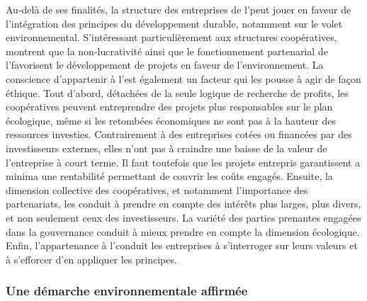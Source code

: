             Au-delà de ses finalités, la structure des entreprises de l’\ess peut jouer en faveur de l’intégration des principes du développement durable, notamment sur le volet environnemental. S’intéressant particulièrement aux structures coopératives, \textcite{bocquet2010economie} montrent que la non-lucrativité ainsi que le fonctionnement partenarial de l’\ess favorisent le développement de projets en faveur de l’environnement. La conscience d’appartenir à l’\ess est également un facteur qui les pousse à agir de façon éthique. Tout d’abord, détachées de la seule logique de recherche de profits, les coopératives peuvent entreprendre des projets plus responsables sur le plan écologique, même si les retombées économiques ne sont pas à la hauteur des ressources investies. Contrairement à des entreprises cotées ou financées par des investisseurs externes, elles n’ont pas à craindre une baisse de la valeur de l’entreprise à court terme. Il faut toutefois que les projets entrepris garantissent a minima une rentabilité permettant de couvrir les coûts engagés. Ensuite, la dimension collective des coopératives, et notamment l’importance des partenariats, les conduit à prendre en compte des intérêts plus larges, plus divers, et non seulement ceux des investisseurs. La variété des parties prenantes engagées dans la gouvernance conduit à mieux prendre en compte la dimension écologique. Enfin, l’appartenance à l’\ess conduit les entreprises à s’interroger sur leurs valeurs et à s’efforcer d’en appliquer les principes.


        \subsubsection{Une démarche environnementale affirmée }

